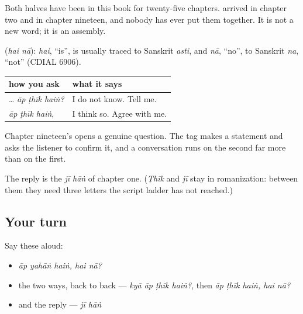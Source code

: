 Both halves have been in this book for twenty-five chapters. \textbf{} arrived in chapter two and \textbf{} in chapter nineteen, and nobody has ever put them together. It is not a new word; it is an assembly.

\begin{cousinweb}
\textbf{ } (\emph{hai nā}): \emph{hai}, \textquotedblleft{}is\textquotedblright{}, is usually traced to Sanskrit \emph{asti}, and \emph{nā}, \textquotedblleft{}no\textquotedblright{}, to Sanskrit \emph{na}, \textquotedblleft{}not\textquotedblright{} (CDIAL 6906).
\end{cousinweb}

\begin{grammarlens}[title={Grammar Lens: two ways to ask, and they mean different things}]
\noindent
\begin{tabularx}{\linewidth}{@{}>{\raggedright\arraybackslash}X>{\raggedright\arraybackslash}X@{}}
\toprule
\textbf{how you ask} & \textbf{what it says} \\
\midrule
\textbf{\ur{کیا}} … \emph{āp ṭhīk haiṅ?} & I do not know. Tell me. \\
\emph{āp ṭhīk haiṅ}, \textbf{\ur{ہے} \ur{نا؟}} & I think so. Agree with me. \\
\bottomrule
\end{tabularx}

Chapter nineteen's \textbf{} opens a genuine question. The tag makes a statement and asks the listener to confirm it, and a conversation runs on the second far more than on the first.

The reply is the \emph{jī hāṅ} of chapter one. (\emph{Ṭhīk} and \emph{jī} stay in romanization: between them they need three letters the script ladder has not reached.)
\end{grammarlens}

\subsection*{Your turn}
Say these aloud:

\begin{itemize}
\raggedright
  \item \emph{āp yahāṅ haiṅ, hai nā?}
  \item the two ways, back to back — \emph{kyā āp ṭhīk haiṅ?}, then \emph{āp ṭhīk haiṅ, hai nā?}
  \item and the reply — \emph{jī hāṅ}
\end{itemize}

